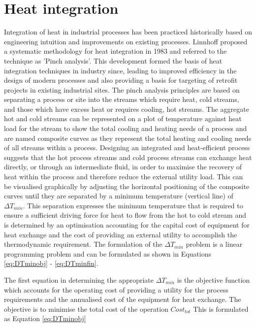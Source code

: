 
\section{Heat integration}
Integration of heat in industrial processes has been practiced historically based on engineering intuition and improvements on existing processes. Linnhoff proposed a systematic methodology for heat integration in 1983 and referred to the technique as 'Pinch analysis'. This development formed the basis of heat integration techniques in industry since, leading to improved efficiency in the design of modern processes and also providing a basis for targeting of retrofit projects in existing industrial sites. The pinch analysis principles are based on separating a process or site into the streams which require heat, cold streams, and those which have excess heat or requires cooling, hot streams. The aggregate hot and cold streams can be represented on a plot of temperature against heat load for the stream to show the total cooling and heating needs of a process and are named composite curves as they represent the total heating and cooling needs of all streams within a process. Designing an integrated and heat-efficient process suggests that the hot process streams and cold process streams can exchange heat directly, or through an intermediate fluid, in order to maximise the recovery of heat within the process and therefore reduce the external utility load. This can be visualised graphically by adjusting the horizontal positioning of the composite curves until they are separated by a minimum temperature (vertical line) of $\Delta T_{min}$. This separation expresses the minimum temperature that is required to ensure a sufficient driving force for heat to flow from the hot to cold stream and is determined by an optimisation accounting for the capital cost of equipment for heat exchange and the cost of providing an external utility to accomplish the thermodynamic requirement. The formulation of the $\Delta T_{min}$ problem is a linear programming problem and can be formulated as shown in Equations \ref{eq:DTminobj} - \ref{eq:DTminfin}.

The first equation in determining the appropriate $\Delta T_{min}$ is the objective function which accounts for the operating cost of providing a utility for the process requirements and the annualised cost of the equipment for heat exchange. The objective is to minimise the total cost of the operation $Cost_{tot}$ This is formulated as Equation \ref{eq:DTminobj}

